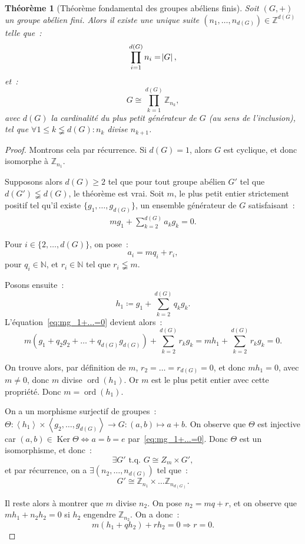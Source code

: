 \documentclass{article}
\newtheorem{thm}{Théorème}[section]
\theoremstyle{definition}
\theoremstyle{remark}
\DeclareMathOperator{\ord}{ord}
\DeclareMathOperator{\Ker}{Ker}
\newcommand{\Z}{\mathbb Z}
\newcommand{\N}{\mathbb N}
\newcommand{\tq}{\text{ t.q. }}
\newcommand{\simeqq}{\cong}
\newcommand{\eng}[1]{\left\langle#1\right\rangle}
\begin{document}
	\begin{thm}[Théorème fondamental des groupes abéliens finis] Soit $(G, +)$ un groupe abélien fini. Alors il existe une unique suite
	$(n_1, \ldots, n_{d(G)}) \in \Z^{d(G)}$ telle que~:
	\[\prod_{i=1}^{d(G)}n_i = \abs G,\]
	et~:
	\[G \simeqq \prod_{k=1}^{d(G)}\Z_{n_k},\]
	avec $d(G)$ la cardinalité du plus petit générateur de $G$ (au sens de l'inclusion), tel que $\forall 1 \leq k \lneqq d(G) : n_k$ divise $n_{k+1}$.
	\end{thm}

	\begin{proof} Montrons cela par récurrence. Si $d(G) = 1$, alors $G$ est cyclique, et donc isomorphe à $\Z_{n_1}$.

	Supposons alors $d(G) \geq 2$ tel que pour tout groupe abélien $G'$ tel que $d(G') \lneqq d(G)$, le théorème est vrai. Soit $m$, le plus petit entier
	strictement positif tel qu'il existe $\{g_1, \ldots, g_{d(G)}\}$, un ensemble générateur de $G$ satisfaisant~:
	\begin{align}\label{eq:mg_1+...=0}
		mg_1 + \sum_{k=2}^{d(G)}a_kg_k = 0.
	\end{align}

	Pour $i \in \{2, \ldots, d(G)\}$, on pose~:
	\[a_i = mq_i + r_i,\]
	pour $q_i \in \N$, et $r_i \in \N$ tel que $r_i \lneqq m$.

	Posons ensuite~:
	\[h_1 \coloneqq g_1 + \sum_{k=2}^{d(G)}q_kg_k.\]
	L'équation~\eqref{eq:mg_1+...=0} devient alors~:
	\[m\left(g_1 + q_2g_2 + \ldots + q_{d(G)}g_{d(G)}\right) + \sum_{k=2}^{d(G)}r_kg_k = mh_1 + \sum_{k=2}^{d(G)}r_kg_k = 0.\]

	On trouve alors, par définition de $m$, $r_2 = \ldots = r_{d(G)} = 0$, et donc $mh_1 = 0$, avec $m \neq 0$, donc $m$ divise $\ord(h_1)$. Or $m$ est le
	plus petit entier avec cette propriété. Donc $m = \ord(h_1)$.

	On a un morphisme surjectif de groupes~: $\Theta : \eng {h_1} \times \eng {g_2, \ldots, g_{d(G)}} \to G : (a, b) \mapsto a+b$. On observe que $\Theta$
	est injective car $(a, b) \in \Ker \Theta \iff a = b = e$ par~\eqref{eq:mg_1+...=0}. Donc $\Theta$ est un isomorphisme, et donc~:
	\[\exists G' \tq G \simeqq Z_m \times G',\]
	et par récurrence, on a $\exists (n_2, \ldots, n_{d(G)})$ tel que~:
	\[G' \simeqq \Z_{n_1} \times \ldots \Z_{n_{d(G)}}.\]

	Il reste alors à montrer que $m$ divise $n_2$. On pose $n_2 = mq + r$, et on observe que $mh_1 + n_2h_2 = 0$ si $h_2$ engendre $\Z_{n_2}$. On a donc~:
	\[m\left(h_1 + qh_2\right) + rh_2 = 0 \Rightarrow r = 0.\]
	\end{proof}
\end{document}
